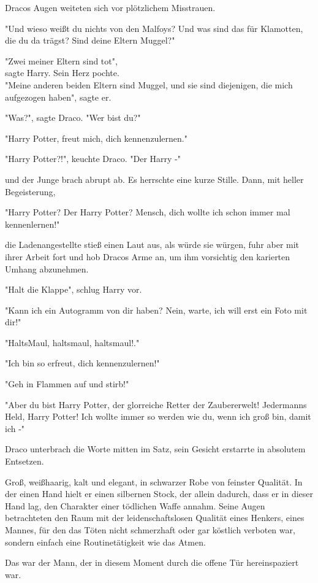 {Dracos Augen weiteten sich vor plötzlichem Misstrauen.

"Und wieso weißt du nichts von den Malfoys? Und was sind das für Klamotten, die du da trägst? Sind deine Eltern Muggel?"

"Zwei meiner Eltern sind tot",\\ sagte Harry. Sein Herz pochte.\\ "Meine anderen beiden Eltern sind Muggel, und sie sind diejenigen, die mich aufgezogen haben", sagte er.

"Was?", sagte Draco. "Wer bist du?"

"Harry Potter, freut mich, dich kennenzulernen."

"Harry Potter?!", keuchte Draco. "Der Harry -"

und der Junge brach abrupt ab. Es herrschte eine kurze Stille. Dann, mit heller Begeisterung,

"Harry Potter? Der Harry Potter? Mensch, dich wollte ich schon immer mal kennenlernen!"

die Ladenangestellte stieß einen Laut aus, als würde sie würgen, fuhr aber mit ihrer Arbeit fort und hob Dracos Arme an, um ihm vorsichtig den karierten Umhang abzunehmen.

"Halt die Klappe", schlug Harry vor.

"Kann ich ein Autogramm von dir haben? Nein, warte, ich will erst ein Foto mit dir!"

"HaltsMaul, haltsmaul, haltsmaul!."

"Ich bin so erfreut, dich kennenzulernen!"

"Geh in Flammen auf und stirb!"

"Aber du bist Harry Potter, der glorreiche Retter der Zaubererwelt! Jedermanns Held, Harry Potter! Ich wollte immer so werden wie du, wenn ich groß bin, damit ich -"

Draco unterbrach die Worte mitten im Satz, sein Gesicht erstarrte in absolutem Entsetzen.

Groß, weißhaarig, kalt und elegant, in schwarzer Robe von feinster Qualität. In der einen Hand hielt er einen silbernen Stock, der allein dadurch, dass er in dieser Hand lag, den Charakter einer tödlichen Waffe annahm. Seine Augen betrachteten den Raum mit der leidenschaftslosen Qualität eines Henkers, eines Mannes, für den das Töten nicht schmerzhaft oder gar köstlich verboten war, sondern einfach eine Routinetätigkeit wie das Atmen.

Das war der Mann, der in diesem Moment durch die offene Tür hereinspaziert war.

}
